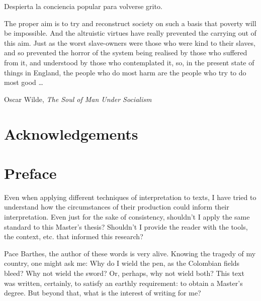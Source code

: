 \documentclass[paper=A4,portrait,twoside=true,twocolumn=false,headinclude=false,footinclude=false,fontsize=11,BCOR=15mm,DIV=calc,pagesize=auto,titlepage=firstiscover,mpinclude=true,headings=normal,headings=twolinechapter,open=right,chapterprefix=false,headsepline=false,parskip=full]{scrbook}
\begin{document}
\begin{spanish}
Despierta la conciencia popular para volverse grito.
\end{spanish}

The proper aim is to try and reconstruct society on such a basis that poverty will be impossible. And the altruistic virtues have really prevented the carrying out of this aim. Just as the worst slave-owners were those who were kind to their slaves, and so prevented the horror of the system being realised by those who suffered from it, and understood by those who contemplated it, so, in the present state of things in England, the people who do most harm are the people who try to do most good \ldots

\vspace{1\baselineskip}

\begin{FlushRight}
Oscar Wilde, \textit{The Soul of Man Under Socialism}
\end{FlushRight}

\vspace*{\fill}

\thispagestyle{empty}

\newpage 
\tableofcontents

\thispagestyle{empty}

\newpage 
\frontmatter
\pagestyle{plain}
\chapter{Acknowledgements} 

\lipsum

\chapter{Preface} 

Even when applying different techniques of interpretation to texts, I have
tried to understand how the circumstances of their production could inform
their interpretation. Even just for the sake of consistency, shouldn't I
apply the same standard to this Master's thesis? Shouldn't I provide the
reader with the tools, the context, etc. that informed this research?

Pace Barthes, the author of these words is very alive. Knowing the tragedy
of my country, one might ask me: Why do I wield the pen, as the Colombian
fields bleed? Why not wield the sword? Or, perhaps, why not wield both?
This text was written, certainly, to satisfy an earthly requirement: to
obtain a Master's degree. But beyond that, what is the interest of writing
for me?
\end{document}
